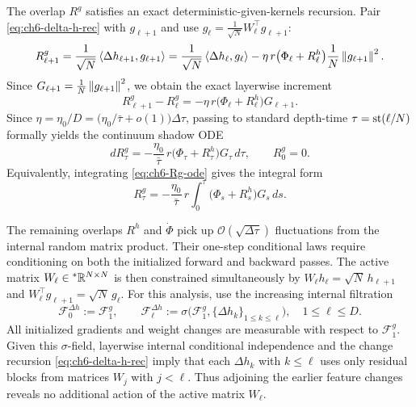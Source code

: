 The overlap $R^g$ satisfies an exact deterministic-given-kernels recursion. Pair \eqref{eq:ch6-delta-h-rec} with $g_{\ell+1}$ and use $g_\ell = \frac{1}{\sqrt{N}} W_\ell^\top g_{\ell+1}$:
\begin{equation}
\label{eq:ch6-Rg-step-expand}
R_{\ell+1}^g = \frac{1}{\sqrt{N}}\left\langle \Delta h_{\ell+1}, g_{\ell+1} \right\rangle
= \frac{1}{\sqrt{N}}\left\langle \Delta h_\ell, g_\ell \right\rangle - \eta\,r\bigl(\Phi_\ell + R_\ell^h\bigr)\frac{1}{N}\left\lVert g_{\ell+1} \right\rVert^2.
\end{equation}
Since $G_{\ell+1} = \frac{1}{N}\left\lVert g_{\ell+1} \right\rVert^2$, we obtain the exact layerwise increment
\begin{equation}
\label{eq:ch6-Rg-exact-inc}
R_{\ell+1}^g - R_\ell^g = -\eta\,r\bigl(\Phi_\ell + R_\ell^h\bigr) G_{\ell+1}.
\end{equation}
Since $\eta = \eta_0 / D = \bigl(\eta_0 / \bar{\tau} + o(1)\bigr)\Delta\tau$, passing to standard depth-time $\tau = \operatorname{st}(\ell / N)$ formally yields the continuum shadow ODE
\begin{equation}
\label{eq:ch6-Rg-ode}
dR_\tau^g = -\frac{\eta_0}{\bar{\tau}}\,r\bigl(\Phi_\tau + R_\tau^h\bigr) G_\tau\,d\tau, \qquad
R_0^g = 0.
\end{equation}
Equivalently, integrating \eqref{eq:ch6-Rg-ode} gives the integral form
\begin{equation}
\label{eq:ch6-Rg-integral}
R_\tau^g = -\frac{\eta_0}{\bar{\tau}}\,r \int_0^\tau \bigl(\Phi_s + R_s^h\bigr) G_s\,ds.
\end{equation}

The remaining overlaps $R^h$ and $\dot{\Phi}$ pick up $\mathcal{O}(\sqrt{\Delta\tau})$ fluctuations from the internal random matrix product. Their one-step conditional laws require conditioning on both the initialized forward and backward passes. The active matrix $W_\ell \in {}^*\mathbb{R}^{N \times N}$ is then constrained simultaneously by $W_\ell h_\ell = \sqrt{N}\,h_{\ell+1}$ and $W_\ell^\top g_{\ell+1} = \sqrt{N}\,g_\ell$. For this analysis, use the increasing internal filtration
\begin{equation}
\label{eq:ch6-delta-h-filtration}
\mathcal{F}_0^{\Delta h} := \mathcal{F}_1^g, \qquad
\mathcal{F}_\ell^{\Delta h} := \sigma\bigl(\mathcal{F}_1^g, \{\Delta h_k\}_{1 \le k \le \ell}\bigr), \quad 1 \le \ell \le D.
\end{equation}
All initialized gradients and weight changes are measurable with respect to $\mathcal{F}_1^g$. Given this $\sigma$-field, layerwise internal conditional independence and the change recursion \eqref{eq:ch6-delta-h-rec} imply that each $\Delta h_k$ with $k \le \ell$ uses only residual blocks from matrices $W_j$ with $j < \ell$. Thus adjoining the earlier feature changes reveals no additional action of the active matrix $W_\ell$.

